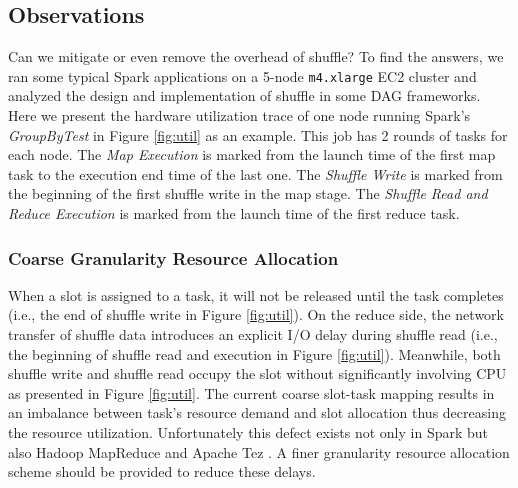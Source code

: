 \subsection{Observations} \label{observation}
Can we mitigate or even remove the overhead of shuffle? 
To find the answers, we ran some typical Spark applications on a 5-node \texttt{m4.xlarge} EC2 cluster and analyzed the design and implementation of shuffle in some DAG frameworks.
Here we present the hardware utilization trace of one node running Spark's \textit{GroupByTest} in Figure \ref{fig:util} as an example. 
This job has 2 rounds of tasks for each node.
The \textit{Map Execution} is marked from the launch time of the first map task to the execution end time of the last one. 
The \textit{Shuffle Write} is marked from the beginning of the first shuffle write in the map stage. 
The \textit{Shuffle Read and Reduce Execution} is marked from the launch time of the first reduce task.
\subsubsection{Coarse Granularity Resource Allocation}
When a slot is assigned to a task, it will not be released until the task completes (i.e., the end of shuffle write in Figure \ref{fig:util}). 
On the reduce side, the network transfer of shuffle data introduces an explicit I/O delay during shuffle read (i.e., the beginning of shuffle read and execution in Figure \ref{fig:util}). 
Meanwhile, both shuffle write and shuffle read occupy the slot without significantly involving CPU as presented in Figure \ref{fig:util}. 
The current coarse slot-task mapping results in an imbalance between task's resource demand and slot allocation thus decreasing the resource utilization. 
Unfortunately this defect exists not only in Spark \cite{apachespark} but also Hadoop MapReduce and Apache Tez \cite{tez}. 
A finer granularity resource allocation scheme should be provided to reduce these delays. 

